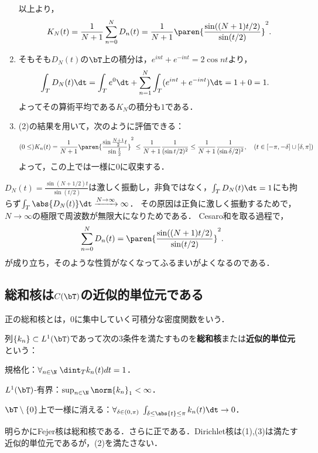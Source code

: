 \documentclass[uplatex,dvipdfmx]{jsreport}
\begin{document}
\begin{Proof}
\begin{enumerate}
        以上より，
        \[K_N(t)=\frac{1}{N+1}\sum_{n=0}^ND_n(t)=\frac{1}{N+1}\paren{\frac{\sin((N+1)t/2)}{\sin(t/2)}}^2.\]
        \item そもそも$D_N(t)$の$\bT$上の積分は，$e^{int}+e^{-int}=2\cos nt$より，
        \begin{align*}
            \int_TD_N(t)\dt&=\int_Te^{0}\dt+\sum_{n=1}^N\int_T(e^{int}+e^{-int})\dt
            =1+0=1.
        \end{align*}
        よってその算術平均である$K_N$の積分も$1$である．
        \item (2)の結果を用いて，次のように評価できる：
        \[(0\le)K_n(t)=\frac{1}{N+1}\paren{\frac{\sin\frac{N+1}{2}t}{\sin\frac{t}{2}}}^2\le\frac{1}{N+1}\frac{1}{(\sin t/2)^2}\le\frac{1}{N+1}\frac{1}{(\sin\delta/2)^2},\quad(t\in[-\pi,-\delta]\cup[\delta,\pi])\]
        よって，この上では一様に$0$に収束する． 
    \end{enumerate}
\end{Proof}
\begin{remarks}[平均によってDirichlet核を飼い慣らす]
    $D_N(t)=\frac{\sin(N+1/2)t}{\sin(t/2)}$は激しく振動し，非負ではなく，$\int_TD_N(t)\dt=1$にも拘らず$\int_T\abs{D_N(t)}\dt\xrightarrow{N\to\infty}\infty$．
    その原因は正負に激しく振動するためで，$N\to\infty$の極限で周波数が無限大になりためである．
    Cesaro和を取る過程で，
    \[\sum_{n=0}^ND_n(t)=\paren{\frac{\sin((N+1)t/2)}{\sin(t/2)}}^2.\]
    が成り立ち，そのような性質がなくなってふるまいがよくなるのである．
\end{remarks}

\subsection{総和核は$C(\bT)$の近似的単位元である}

\begin{tcolorbox}[colframe=ForestGreen, colback=ForestGreen!10!white,breakable,colbacktitle=ForestGreen!40!white,coltitle=black,fonttitle=\bfseries\sffamily,
title=]
    正の総和核とは，$0$に集中していく可積分な密度関数をいう．
\end{tcolorbox}

\begin{definition}
    列$\{k_n\}\subset L^1(\bT)$であって次の3条件を満たすものを\textbf{総和核}または\textbf{近似的単位元}\cite{Stein-Shakarchi-03-Fourier}という：
    \begin{enumerate}[{[S}1{]}]
        \item 規格化：$\forall_{n\in\N}\;\dint_Tk_n(t)dt=1$．
        \item $L^1(\bT)$-有界：$\sup_{n\in\N}\norm{k_n}_1<\infty$．
        \item $\bT\setminus\{0\}$上で一様に消える：$\forall_{\delta\in(0,\pi)}\;\int_{\delta\le\abs{t}\le\pi}k_n(t)\dt\to0$．
    \end{enumerate}
    明らかにFejer核は総和核である．さらに正である．Dirichlet核は(1),(3)は満たす近似的単位元であるが，(2)を満たさない．
\end{definition}
\end{document}
